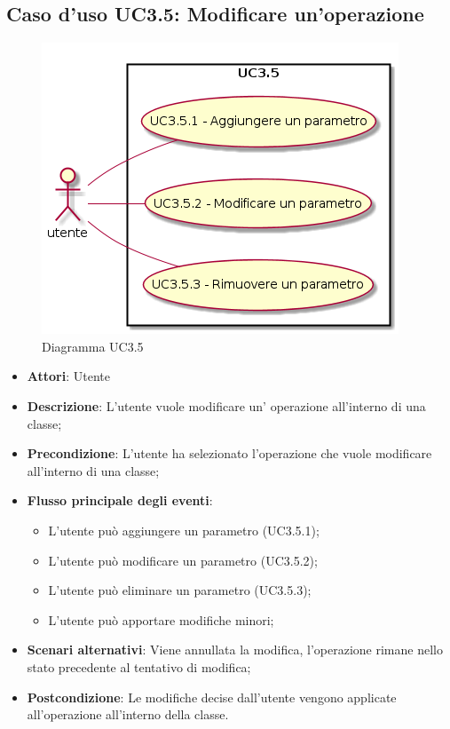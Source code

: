 \documentclass[../AnalisiDeiRequisiti.tex]{subfiles}
\begin{document}
		\subsection{Caso d'uso UC3.5: Modificare un'operazione}
		\begin{figure} [H]
			\centering
			\includegraphics[scale=0.45]{./Figures/UC3_5.png}
			\caption{Diagramma UC3.5}\label{}
		\end{figure}
		\begin{itemize}
			\item \textbf{Attori}: Utente
			\item \textbf{Descrizione}: L'utente vuole modificare un' operazione all'interno di una classe;
			\item \textbf{Precondizione}: L'utente ha selezionato l'operazione che vuole modificare all'interno di una classe;
			\item \textbf{Flusso principale degli eventi}: \begin{itemize}
				\item L'utente può aggiungere un parametro (UC3.5.1);
				\item L'utente può modificare un parametro (UC3.5.2);
				\item L'utente può eliminare un parametro (UC3.5.3);
				\item L'utente può apportare modifiche minori;
			\end{itemize}
			\item \textbf{Scenari alternativi}: Viene annullata la modifica, l'operazione rimane nello stato precedente al tentativo di modifica;
			\item \textbf{Postcondizione}: Le modifiche decise dall'utente vengono applicate all'operazione all'interno della classe.
		\end{itemize}
\end{document}
